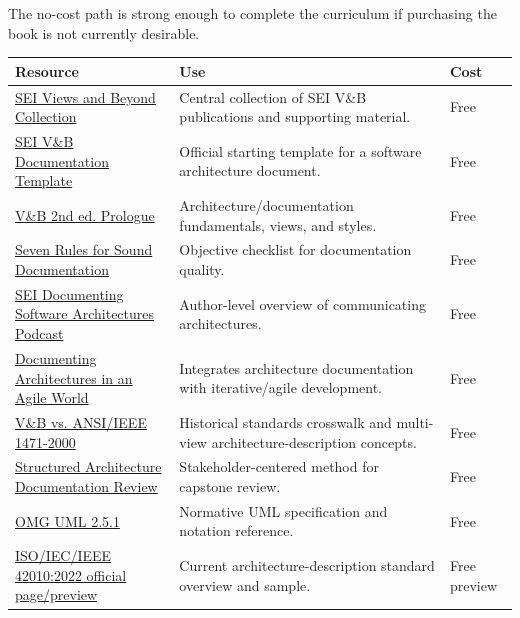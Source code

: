 \documentclass[10pt,letterpaper]{article}
\begin{document}
The no-cost path is strong enough to complete the curriculum if purchasing the book is not currently desirable.

\begin{longtable}{@{}P{0.37\textwidth}P{0.48\textwidth}P{0.09\textwidth}@{}}
\toprule
{}\color{white}\textbf{Resource} & \color{white}\textbf{Use} & \color{white}\textbf{Cost} \\
\midrule
\endhead
\href{https://www.sei.cmu.edu/library/views-and-beyond-collection/}{SEI Views and Beyond Collection} & Central collection of SEI V\&B publications and supporting material. & Free \\
\href{https://www.sei.cmu.edu/library/views-and-beyond-documentation-template/}{SEI V\&B Documentation Template} & Official starting template for a software architecture document. & Free \\
\href{https://www.informit.com/articles/article.aspx?p=1641654}{V\&B 2nd ed. Prologue} & Architecture/documentation fundamentals, views, and styles. & Free \\
\href{https://www.informit.com/articles/article.aspx?p=1641654&seqNum=5}{Seven Rules for Sound Documentation} & Objective checklist for documentation quality. & Free \\
\href{https://www.sei.cmu.edu/library/documenting-software-architectures-podcast/}{SEI Documenting Software Architectures Podcast} & Author-level overview of communicating architectures. & Free \\
\href{https://www.sei.cmu.edu/library/documenting-software-architectures-in-an-agile-world/}{Documenting Architectures in an Agile World} & Integrates architecture documentation with iterative/agile development. & Free \\
\href{https://www.sei.cmu.edu/library/comparing-the-seis-views-and-beyond-approach-for-documenting-software-architectures-with-ansi-ieee-1471-2000/}{V\&B vs. ANSI/IEEE 1471-2000} & Historical standards crosswalk and multi-view architecture-description concepts. & Free \\
\href{https://www.sei.cmu.edu/library/a-structured-approach-for-reviewing-architecture-documentation/}{Structured Architecture Documentation Review} & Stakeholder-centered method for capstone review. & Free \\
\href{https://www.omg.org/spec/UML/}{OMG UML 2.5.1} & Normative UML specification and notation reference. & Free \\
\href{https://www.iso.org/standard/74393.html}{ISO/IEC/IEEE 42010:2022 official page/preview} & Current architecture-description standard overview and sample. & Free preview \\
\bottomrule
\end{longtable}
\end{document}
